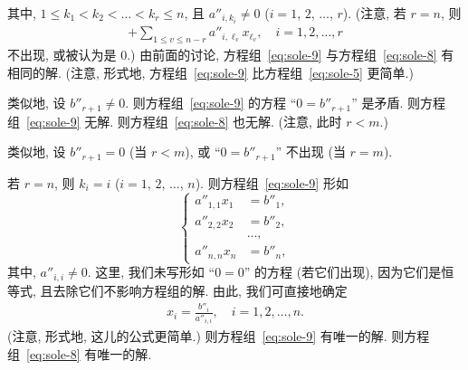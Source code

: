 \documentclass[../libro.tex]{subfiles}
\begin{document}
其中, \(1 \leq k_1 < k_2 < \dots < k_r \leq n\),
且 \(a''_{i,k_i} \neq 0\)
(\(i = 1\), \(2\), \(\dots\), \(r\)).
(注意, 若 \(r = n\), 则
    \begin{align*}
        + \sum_{1 \leq v \leq n-r} {a''_{i,\ell_v} x_{\ell_v}},
        \quad
        i = 1, 2, \dots, r
    \end{align*}
不出现, 或被认为是 \(0\).)
由前面的讨论, 方程组~\eqref{eq:sole-9}
与方程组~\eqref{eq:sole-8} 有相同的解.
(注意, 形式地, 方程组~\eqref{eq:sole-9}
比方程组~\eqref{eq:sole-5} 更简单.)

类似地, 设 \(b''_{r+1} \neq 0\).
则方程组~\eqref{eq:sole-9} 的方程
``\(0 = b''_{r+1}\)'' 是矛盾.
则方程组~\eqref{eq:sole-9} 无解.
则方程组~\eqref{eq:sole-8} 也无解.
(注意, 此时 \(r < m\).)

类似地, 设 \(b''_{r+1} = 0\) (当 \(r < m\)),
或 ``\(0 = b''_{r+1}\)'' 不出现 (当 \(r = m\)).

若 \(r = n\),
则 \(k_i = i\) (\(i = 1\), \(2\), \(\dots\), \(n\)).
则方程组~\eqref{eq:sole-9} 形如
\begin{equation*}
    \left\{ %
    \begin{aligned}
        a''_{1,1} x_1 & = b''_1, \\
        a''_{2,2} x_2 & = b''_2, \\
        & \dots, \\
        a''_{n,n} x_n & = b''_n,
    \end{aligned}
    \right. %
\end{equation*}
其中, \(a''_{i,i} \neq 0\).
这里, 我们未写形如 ``\(0 = 0\)'' 的方程 (若它们出现),
因为它们是恒等式,
且去除它们不影响方程组的解.
由此, 我们可直接地确定
\begin{align*}
    x_i = \frac{b''_i}{a''_{i,i}},
    \quad i = 1, 2, \dots, n.
\end{align*}
(注意, 形式地, 这儿的公式更简单.)
则方程组~\eqref{eq:sole-9} 有唯一的解.
则方程组~\eqref{eq:sole-8} 有唯一的解.
\end{document}
